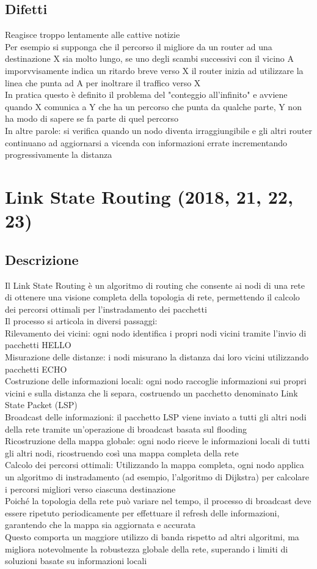 \documentclass[10pt,oneside,a4paper]{article}
\begin{document}
\subsection{Difetti}
Reagisce troppo lentamente alle cattive notizie\\
Per esempio si supponga che il percorso il migliore da un router ad una destinazione X sia molto lungo, se uno degli scambi successivi con il vicino A imporvvisamente indica un ritardo breve verso X il router inizia ad utilizzare la linea che punta ad A per inoltrare il traffico verso X\\
In pratica questo è definito il problema del "conteggio all'infinito" e avviene quando X comunica a Y che ha un percorso che punta da qualche parte, Y non ha modo di sapere se fa parte di quel percorso\\
In altre parole: si verifica quando un nodo diventa irraggiungibile e gli altri router continuano ad aggiornarsi a vicenda con informazioni errate incrementando progressivamente la distanza
\section{Link State Routing (2018, 21, 22, 23)}
\subsection{Descrizione}
Il Link State Routing è un algoritmo di routing che consente ai nodi di una rete di ottenere una visione completa della topologia di rete, permettendo il calcolo dei percorsi ottimali per l'instradamento dei pacchetti\\
Il processo si articola in diversi passaggi:\\
Rilevamento dei vicini: ogni nodo identifica i propri nodi vicini tramite l’invio di pacchetti HELLO\\
Misurazione delle distanze: i nodi misurano la distanza dai loro vicini utilizzando pacchetti ECHO\\
Costruzione delle informazioni locali: ogni nodo raccoglie informazioni sui propri vicini e sulla distanza che li separa, costruendo un pacchetto denominato Link State Packet (LSP)\\
Broadcast delle informazioni: il pacchetto LSP viene inviato a tutti gli altri nodi della rete tramite un’operazione di broadcast basata sul flooding\\
Ricostruzione della mappa globale: ogni nodo riceve le informazioni locali di tutti gli altri nodi, ricostruendo così una mappa completa della rete\\
Calcolo dei percorsi ottimali: Utilizzando la mappa completa, ogni nodo applica un algoritmo di instradamento (ad esempio, l’algoritmo di Dijkstra) per calcolare i percorsi migliori verso ciascuna destinazione\\
Poiché la topologia della rete può variare nel tempo, il processo di broadcast deve essere ripetuto periodicamente per effettuare il refresh delle informazioni, garantendo che la mappa sia aggiornata e accurata\\
Questo comporta un maggiore utilizzo di banda rispetto ad altri algoritmi, ma migliora notevolmente la robustezza globale della rete, superando i limiti di soluzioni basate su informazioni locali
\end{document}
